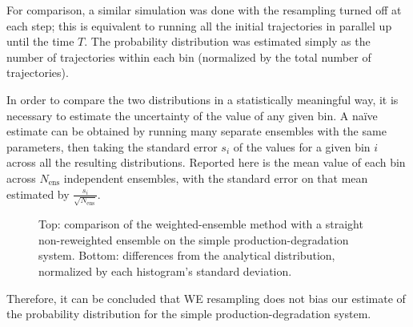 \documentclass[english,letterpaper,12pt]{article}
\begin{document}
\begin{doublespacing}
For comparison, a similar simulation was done with the resampling turned off at each step; this is equivalent to running all the initial trajectories in parallel up until the time $T$. The probability distribution was estimated simply as the number of trajectories within each bin (normalized by the total number of trajectories). 

In order to compare the two distributions in a statistically meaningful way, it is necessary to estimate the uncertainty of the value of any given bin. A na\"{i}ve estimate can be obtained by running many separate ensembles with the same parameters, then taking the standard error $s_i$ of the values for a given bin $i$ across all the resulting distributions. Reported here is the mean value of each bin across $N_\text{ens}$ independent ensembles, with the standard error on that mean estimated by $\frac{s_i}{\sqrt{N_\text{ens}}}$.




\begin{figure}[hp]
    \begin{center}
        \begin{subfigure}{\textwidth}
            \label{sfg:gaussvf-comparison}
        \end{subfigure}

        \begin{subfigure}{\textwidth}
            \label{sfg:gaussvf-chi}
        \end{subfigure}
    \end{center}
    \caption{Top: comparison of the weighted-ensemble method with a straight non-reweighted ensemble on the simple production-degradation system. Bottom: differences from the analytical distribution, normalized by each histogram's standard deviation.}
    \label{fig:gaussian-verification}
\end{figure}

Therefore, it can be concluded that WE resampling does not bias our estimate of the probability distribution for the simple production-degradation system.


\end{doublespacing}
\end{document}
